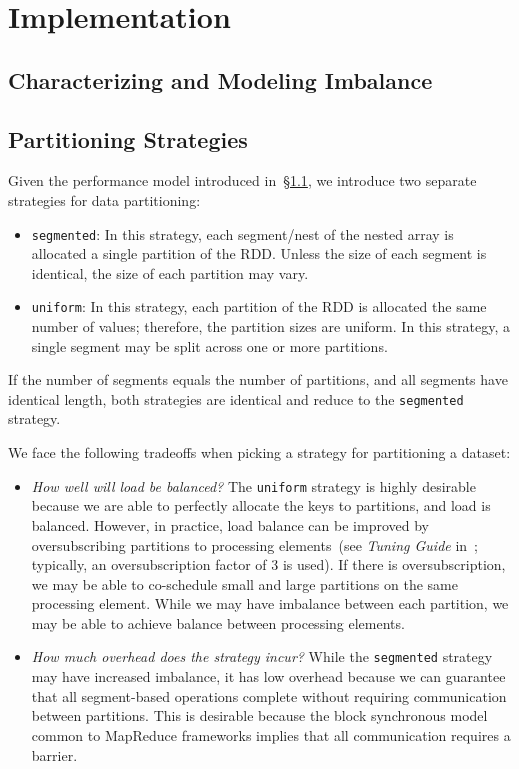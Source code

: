 \documentclass[preprint]{sigplanconf}
\theoremstyle{definition}
\begin{document}
\section{Implementation}
\label{sec:implementation}

\subsection{Characterizing and Modeling Imbalance}
\label{sec:imbalance}

\subsection{Partitioning Strategies}
\label{sec:partitioning-strategies}

Given the performance model introduced in~\S\ref{sec:imbalance}, we introduce two separate strategies
for data partitioning:

\begin{itemize}
\item \texttt{segmented}: In this strategy, each segment/nest of the nested array is allocated a single
partition of the RDD. Unless the size of each segment is identical, the size of each partition may vary.
\item \texttt{uniform}: In this strategy, each partition of the RDD is allocated the same number of
values; therefore, the partition sizes are uniform. In this strategy, a single segment may be split across
one or more partitions.
\end{itemize}

If the number of segments equals the number of partitions, and all segments have identical length,
both strategies are identical and reduce to the \texttt{segmented} strategy.

We face the following tradeoffs when picking a strategy for partitioning a dataset:

\begin{itemize}
\item \emph{How well will load be balanced?} The \texttt{uniform} strategy is highly desirable
because we are able to perfectly allocate the keys to partitions, and load is balanced. However, in
practice, load balance can be improved by oversubscribing partitions to processing elements~(see
\emph{Tuning Guide} in~\cite{spark}; typically, an oversubscription factor of 3 is used). If there is
oversubscription, we may be able to co-schedule small and large partitions on the same processing
element. While we may have imbalance between each partition, we may be able to achieve balance
between processing elements.
\item \emph{How much overhead does the strategy incur?} While the \linebreak \texttt{segmented}
strategy may have increased imbalance, it has low overhead because we can guarantee that all
segment-based operations complete without requiring communication between partitions. This is
desirable because the block synchronous model common to MapReduce frameworks implies that all
communication requires a barrier.
\end{itemize}
\end{document}
